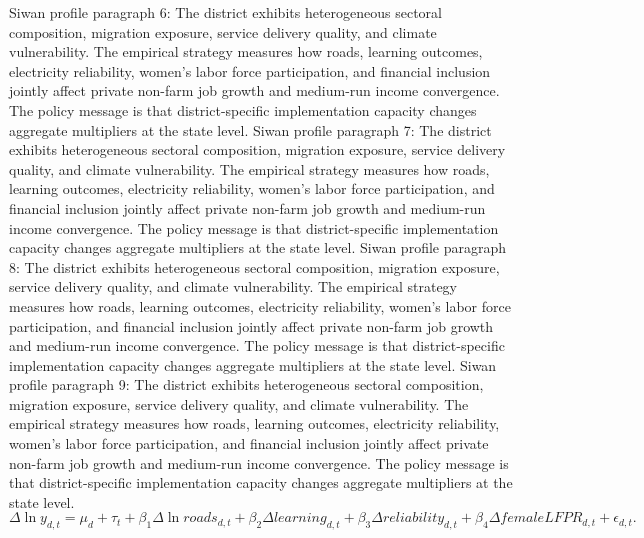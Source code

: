 \documentclass[preprint,12pt]{elsarticle}
\begin{document}
Siwan profile paragraph 6: The district exhibits heterogeneous sectoral composition, migration exposure, service delivery quality, and climate vulnerability. The empirical strategy measures how roads, learning outcomes, electricity reliability, women's labor force participation, and financial inclusion jointly affect private non-farm job growth and medium-run income convergence. The policy message is that district-specific implementation capacity changes aggregate multipliers at the state level.
Siwan profile paragraph 7: The district exhibits heterogeneous sectoral composition, migration exposure, service delivery quality, and climate vulnerability. The empirical strategy measures how roads, learning outcomes, electricity reliability, women's labor force participation, and financial inclusion jointly affect private non-farm job growth and medium-run income convergence. The policy message is that district-specific implementation capacity changes aggregate multipliers at the state level.
Siwan profile paragraph 8: The district exhibits heterogeneous sectoral composition, migration exposure, service delivery quality, and climate vulnerability. The empirical strategy measures how roads, learning outcomes, electricity reliability, women's labor force participation, and financial inclusion jointly affect private non-farm job growth and medium-run income convergence. The policy message is that district-specific implementation capacity changes aggregate multipliers at the state level.
Siwan profile paragraph 9: The district exhibits heterogeneous sectoral composition, migration exposure, service delivery quality, and climate vulnerability. The empirical strategy measures how roads, learning outcomes, electricity reliability, women's labor force participation, and financial inclusion jointly affect private non-farm job growth and medium-run income convergence. The policy message is that district-specific implementation capacity changes aggregate multipliers at the state level.
\begin{equation}\Delta \ln y_{d,t}=\mu_d+\tau_t+\beta_1\Delta\ln roads_{d,t}+\beta_2\Delta learning_{d,t}+\beta_3\Delta reliability_{d,t}+\beta_4\Delta femaleLFPR_{d,t}+\epsilon_{d,t}.\end{equation}
\end{document}
